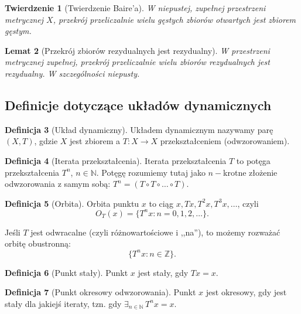 \documentclass[licencjacka]{pwr_wmat_praca_dyplomowa}
\theoremstyle{plain}
\newtheorem{theorem}{Twierdzenie}
\numberwithin{theorem}{chapter}
\newtheorem{lemma}[theorem]{Lemat}
\theoremstyle{definition}
\numberwithin{theorem}{chapter}
\newtheorem{definition}[theorem]{Definicja}
\begin{document}
\begin{theorem}[Twierdzenie Baire'a]
\label{twierdzenie_bairea}
W niepustej, zupełnej przestrzeni metrycznej $X$, przekrój przeliczalnie wielu gęstych zbiorów otwartych jest zbiorem gęstym.
\end{theorem}


\begin{lemma}[Przekrój zbiorów rezydualnych jest rezydualny] \label{przekroj_rezydualnych_jest_rezydualny}
W przestrzeni metrycznej zupełnej, przekrój przeliczalnie wielu zbiorów rezydualnych jest rezydualny. W szczególności niepusty.
\end{lemma}



\subsection{Definicje dotyczące układów dynamicznych}

\begin{definition}[Układ dynamiczny]
Układem dynamicznym nazywamy parę $(X, T)$, gdzie $X$ jest zbiorem a $T:X \rightarrow X$ przekształceniem (odwzorowaniem).
\end{definition}

\begin{definition}[Iterata przekształcenia]
Iterata przekształcenia $T$ to potęga przekształcenia $T^n$, $n \in \mathbb{N}$. Potęgę rozumiemy tutaj jako $n-$krotne złożenie odwzorowania z samym sobą: $T^n = (T \circ T \circ \ldots \circ T).$
\end{definition}

\begin{definition}[Orbita]
Orbita punktu $x$ to ciąg $x, Tx, T^2x, T^3x,\ldots$, czyli 
$$O_T(x) = \{T^nx: n=0,1,2,\ldots\}.$$

Jeśli $T$ jest odwracalne (czyli różnowartościowe i ,,na''), to możemy rozważać orbitę obustronną:
$$\{T^nx: n \in \mathbb{Z}\}.$$
\end{definition}

\begin{definition}[Punkt stały]
Punkt $x$ jest stały, gdy $Tx = x$.
\end{definition}

\begin{definition}[Punkt okresowy odwzorowania]
Punkt $x$ jest okresowy, gdy jest stały dla jakiejś iteraty, tzn. gdy $\exists_{n \in \mathbb{N}} \, T^nx = x$.
\end{definition}
\end{document}
